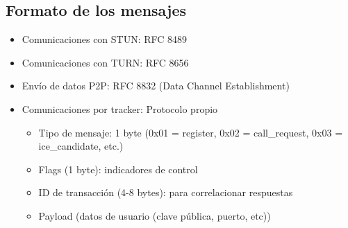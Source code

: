 \documentclass{article}
\begin{document}
    \subsection{Formato de los mensajes}
    \begin{itemize}
        \item Comunicaciones con STUN: RFC 8489
        \item Comunicaciones con TURN: RFC 8656
        \item Envío de datos P2P: RFC 8832 (Data Channel Establishment)
        \item Comunicaciones por tracker: Protocolo propio
            \begin{itemize}
                \item Tipo de mensaje: 1 byte (0x01 = register, 0x02 = call_request, 0x03 = ice_candidate, etc.)
                \item Flags (1 byte): indicadores de control
                \item ID de transacción (4-8 bytes): para correlacionar respuestas
                \item Payload (datos de usuario (clave pública, puerto, etc))
            \end{itemize}
    \end{itemize}
\end{document}
